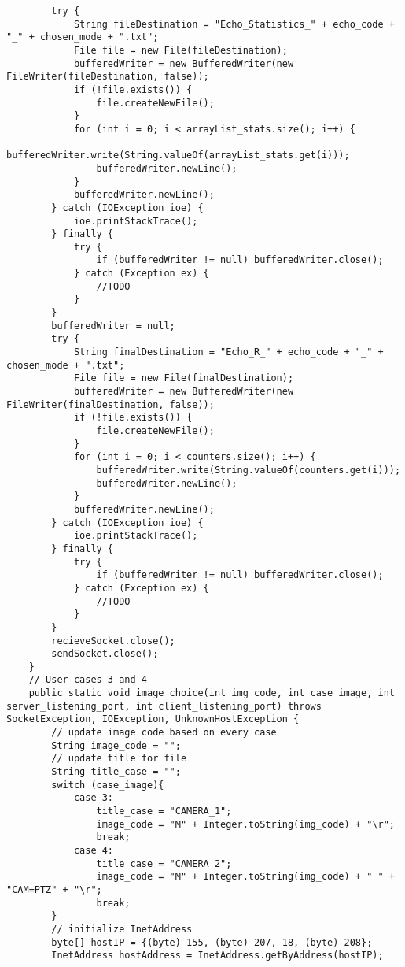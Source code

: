 \documentclass{article}
\begin{document}
\begin{lstlisting}
        try {
            String fileDestination = "Echo_Statistics_" + echo_code + "_" + chosen_mode + ".txt";
            File file = new File(fileDestination);
            bufferedWriter = new BufferedWriter(new FileWriter(fileDestination, false));
            if (!file.exists()) {
                file.createNewFile();
            }
            for (int i = 0; i < arrayList_stats.size(); i++) {
                bufferedWriter.write(String.valueOf(arrayList_stats.get(i)));
                bufferedWriter.newLine();
            }
            bufferedWriter.newLine();
        } catch (IOException ioe) {
            ioe.printStackTrace();
        } finally {
            try {
                if (bufferedWriter != null) bufferedWriter.close();
            } catch (Exception ex) {
                //TODO
            }
        }
        bufferedWriter = null;
        try {
            String finalDestination = "Echo_R_" + echo_code + "_" + chosen_mode + ".txt";
            File file = new File(finalDestination);
            bufferedWriter = new BufferedWriter(new FileWriter(finalDestination, false));
            if (!file.exists()) {
                file.createNewFile();
            }
            for (int i = 0; i < counters.size(); i++) {
                bufferedWriter.write(String.valueOf(counters.get(i)));
                bufferedWriter.newLine();
            }
            bufferedWriter.newLine();
        } catch (IOException ioe) {
            ioe.printStackTrace();
        } finally {
            try {
                if (bufferedWriter != null) bufferedWriter.close();
            } catch (Exception ex) {
                //TODO
            }
        }
        recieveSocket.close();
        sendSocket.close();
    }
    // User cases 3 and 4
    public static void image_choice(int img_code, int case_image, int server_listening_port, int client_listening_port) throws SocketException, IOException, UnknownHostException {
        // update image code based on every case
        String image_code = "";
        // update title for file
        String title_case = "";
        switch (case_image){
            case 3:
                title_case = "CAMERA_1";
                image_code = "M" + Integer.toString(img_code) + "\r";
                break;
            case 4:
                title_case = "CAMERA_2";
                image_code = "M" + Integer.toString(img_code) + " " + "CAM=PTZ" + "\r";
                break;
        }
        // initialize InetAddress
        byte[] hostIP = {(byte) 155, (byte) 207, 18, (byte) 208};
        InetAddress hostAddress = InetAddress.getByAddress(hostIP);

\end{lstlisting}
\end{document}
